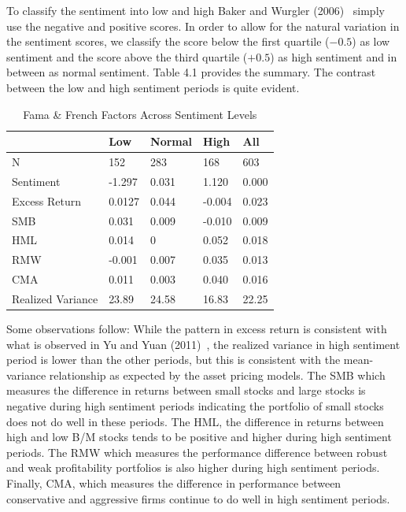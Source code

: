 To classify the sentiment into low and high Baker and Wurgler (2006)~\cite{baker2006investor} simply use the negative and positive scores. In order to allow for the natural variation in the sentiment scores, we classify the score below the first quartile ($-0.5$) as low sentiment and the score above the third quartile ($+0.5$) as high sentiment and in between as normal sentiment. Table 4.1 provides the summary. The contrast between the low and high sentiment periods is quite evident.

        \begin{table}[!ht]
        \caption{Fama \& French Factors Across Sentiment Levels \label{tab:famafrench}}
        \begin{tabular}{lllll}
        & Low &     Normal      & High & All \\ \hline
        N & 152 &  283  & 168 & 603 \\
        Sentiment & -1.297 &  0.031  & 1.120 & 0.000 \\
        Excess Return & 0.0127 &  0.044  & -0.004 & 0.023 \\ 
        SMB & 0.031 &  0.009  & -0.010 & 0.009 \\
        HML & 0.014 & 0 & 0.052 & 0.018 \\
        RMW & -0.001 &  0.007  & 0.035& 0.013 \\
        CMA & 0.011 &  0.003  & 0.040 & 0.016 \\
        Realized Variance & 23.89 &  24.58  & 16.83 & 22.25
        \end{tabular}
        \end{table}

Some observations follow: While the pattern in excess return is consistent with what is observed in Yu and Yuan (2011)~\cite{yuyuan}, the realized variance in high sentiment period is lower than the other periods, but this is consistent with the mean-variance relationship as expected by the asset pricing models. The SMB which measures the difference in returns between small stocks and large stocks is negative during high sentiment periods indicating the portfolio of small stocks does not do well in these periods. The HML, the difference in returns between high and low B/M stocks tends to be positive and higher during high sentiment periods. The RMW which measures the performance difference between robust and weak profitability portfolios is also higher during high sentiment periods. Finally, CMA, which measures the difference in performance between conservative and aggressive firms continue to do well in high sentiment periods.


